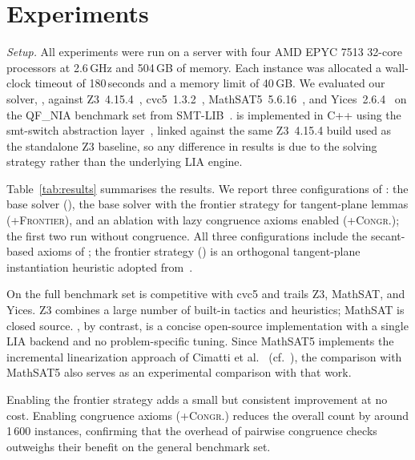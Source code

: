 \section{Experiments}\label{sec:experiments}

\emph{Setup.} All experiments were run on a server with four AMD EPYC 7513 32-core processors at 2.6\,GHz
and 504\,GB of memory.
Each instance was allocated a wall-clock timeout of 180\,seconds and a memory limit of 40\,GB.
We evaluated our solver, \solver, against Z3~4.15.4~\cite{z3}, cvc5~1.3.2~\cite{cvc5}, MathSAT5~5.6.16~\cite{mathsat5},
and Yices~2.6.4~\cite{Dutertre:cav2014} on the QF\_NIA benchmark set from SMT-LIB~\cite{smtlib}.
\solver is implemented in C++ using the smt-switch abstraction layer~\cite{mann2021smt},
linked against the same Z3~4.15.4 build used as the standalone Z3 baseline,
so any difference in results is due to the solving strategy rather than the underlying LIA engine.

Table~\ref{tab:results} summarises the results.
We report three configurations of \solver: the base solver (\solver), the base solver with
the frontier strategy for tangent-plane lemmas (\solver+\textsc{Frontier}), and an ablation
with lazy congruence axioms enabled (\solver+\textsc{Congr.}); the first two run without
congruence.
All three configurations include the secant-based axioms of ;
the frontier strategy () is an orthogonal tangent-plane
instantiation heuristic adopted from~\cite{cimatti2017tacas}.





On the full benchmark set \solver is competitive with cvc5 and trails Z3, MathSAT, and
Yices. Z3 combines a large number of built-in tactics and heuristics; MathSAT is
closed source. \solver, by contrast, is a concise open-source implementation with a
single LIA backend and no problem-specific tuning.
Since MathSAT5 implements the incremental linearization approach of Cimatti et
al.~\cite{cimatti2018sat} (cf.\ ), the comparison with
MathSAT5 also serves as an experimental comparison with that work.

Enabling the frontier strategy adds a small but consistent improvement at no cost.
Enabling congruence axioms (\solver+\textsc{Congr.}) reduces the overall count by around
1\,600 instances, confirming that the overhead of pairwise congruence checks outweighs
their benefit on the general benchmark set.

